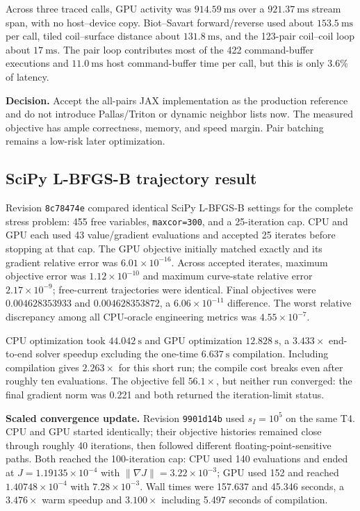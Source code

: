 \documentclass[11pt,a4paper]{article}
\newcommand{\code}[1]{\texttt{#1}}
\begin{document}
Across three traced calls, GPU activity was $914.59\ \mathrm{ms}$ over a
$921.37\ \mathrm{ms}$ stream span, with no host--device copy.  Biot--Savart
forward/reverse used about $153.5\ \mathrm{ms}$ per call, tiled coil--surface
distance about $131.8\ \mathrm{ms}$, and the 123-pair coil--coil loop about
$17\ \mathrm{ms}$.  The pair loop contributes most of the 422 command-buffer
executions and $11.0\ \mathrm{ms}$ host command-buffer time per call, but this
is only 3.6\% of latency.

\textbf{Decision.}  Accept the all-pairs JAX implementation as the production
reference and do not introduce Pallas/Triton or dynamic neighbor lists now.
The measured objective has ample correctness, memory, and speed margin.  Pair
batching remains a low-risk later optimization.

\subsection{SciPy L-BFGS-B trajectory result}\label{sec:trajectory}

Revision \code{8c78474e} compared identical SciPy L-BFGS-B settings for the
complete stress problem: 455 free variables, \code{maxcor=300}, and a
25-iteration cap.  CPU and GPU each used 43 value/gradient evaluations and
accepted 25 iterates before stopping at that cap.  The GPU objective initially
matched exactly and its gradient relative error was $6.01\times10^{-16}$.
Across accepted iterates, maximum objective error was $1.12\times10^{-10}$ and
maximum curve-state relative error $2.17\times10^{-9}$; free-current trajectories
were identical.  Final objectives were $0.004628353933$ and $0.004628353872$,
a $6.06\times10^{-11}$ difference.  The worst relative discrepancy among all
CPU-oracle engineering metrics was $4.55\times10^{-7}$.

CPU optimization took $44.042\ \mathrm{s}$ and GPU optimization
$12.828\ \mathrm{s}$, a $3.433\times$ end-to-end solver speedup excluding the
one-time $6.637\ \mathrm{s}$ compilation.  Including compilation gives
$2.263\times$ for this short run; the compile cost breaks even after roughly
ten evaluations.  The objective fell $56.1\times$, but neither run converged:
the final gradient norm was 0.221 and both returned the iteration-limit status.

\textbf{Scaled convergence update.}  Revision \code{9901d14b} used
$s_I=10^5$ on the same T4.  CPU and GPU started identically; their objective
histories remained close through roughly 40 iterations, then followed different
floating-point-sensitive paths.  Both reached the 100-iteration cap: CPU used 140 evaluations and ended
at $J=1.19135\times10^{-4}$ with $\lVert\nabla J\rVert=3.22\times10^{-3}$;
GPU used 152 and reached $1.40748\times10^{-4}$ with
$7.28\times10^{-3}$.  Wall times were 157.637 and 45.346 seconds, a
$3.476\times$ warm speedup and $3.100\times$ including 5.497 seconds of
compilation.
\end{document}
